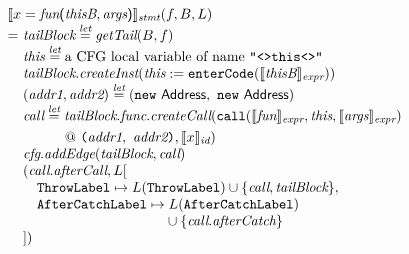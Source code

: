 \[\begin{array}{l@{}l@{~}l}
\lefteqn{\transfun{\ircfgcall{x}{\emph{fun}}{\emph{thisB}, \emph{args}}}_{\emph{stmt}}(f, B, L)}\\
& = & \emph{tailBlock} \letval \getTail(B, f)\\
& & \emph{this} \letval \mbox{a CFG local variable of name \TT{"<>this<>"}}\\
& & \emph{tailBlock}.\emph{createInst}(\emph{this} := \TT{enterCode}(\transfun{\emph{thisB}}_{\emph{expr}}))\\
& & (\emph{addr1}, \emph{addr2}) \letval (\new\ \Address,\ \new\ \Address)\\
& & \emph{call} \letval \emph{tailBlock}.\emph{func}.\emph{createCall}(\TT{call}(\transfun{\emph{fun}}_{\emph{expr}}, \emph{this}, \transfun{\emph{args}}_{\emph{expr}})\\
&& \phantom{\emph{call} \letval }
 ~@~ \TT{(}\emph{addr1},\ \emph{addr2}\TT{)}, \transfun{x}_{\emph{id}})\\
& & \emph{cfg}.\emph{addEdge}(\emph{tailBlock}, \emph{call})\\
& & (\emph{call}.\emph{afterCall}, L[\\
& & \quad \ThrowLabel \mapsto L(\ThrowLabel) \cup \{ \emph{call}, \emph{tailBlock} \},\\
& & \quad \AfterCatchLabel \mapsto L(\AfterCatchLabel)\\
& & \quad \phantom{\AfterCatchLabel \mapsto} \cup \{ \emph{call}.\emph{afterCatch} \}\\
& & ])\\
\end{array}
\]

